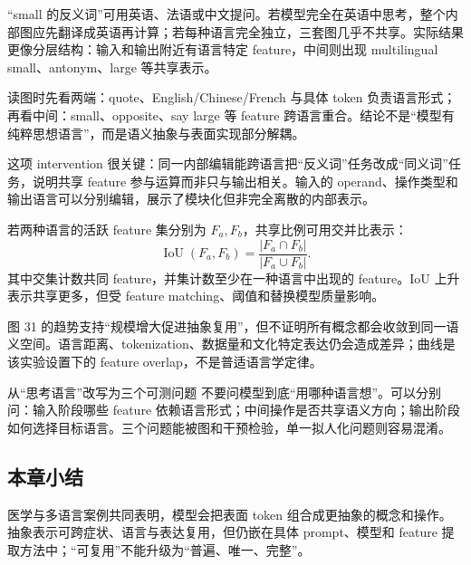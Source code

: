 “small 的反义词”可用英语、法语或中文提问。若模型完全在英语中思考，整个内部图应先翻译成英语再计算；若每种语言完全独立，三套图几乎不共享。实际结果更像分层结构：输入和输出附近有语言特定 feature，中间则出现 multilingual small、antonym、large 等共享表示。



读图时先看两端：quote、English/Chinese/French 与具体 token 负责语言形式；再看中间：small、opposite、say large 等 feature 跨语言重合。结论不是“模型有纯粹思想语言”，而是语义抽象与表面实现部分解耦。


这项 intervention 很关键：同一内部编辑能跨语言把“反义词”任务改成“同义词”任务，说明共享 feature 参与运算而非只与输出相关。输入的 operand、操作类型和输出语言可以分别编辑，展示了模块化但非完全离散的内部表示。

若两种语言的活跃 feature 集分别为 $F_a,F_b$，共享比例可用交并比表示：
\[
\operatorname{IoU}(F_a,F_b)=\frac{|F_a\cap F_b|}{|F_a\cup F_b|}.
\]
其中交集计数共同 feature，并集计数至少在一种语言中出现的 feature。IoU 上升表示共享更多，但受 feature matching、阈值和替换模型质量影响。


图 31 的趋势支持“规模增大促进抽象复用”，但不证明所有概念都会收敛到同一语义空间。语言距离、tokenization、数据量和文化特定表达仍会造成差异；曲线是该实验设置下的 feature overlap，不是普适语言学定律。

\begin{knowledgebox}{从“思考语言”改写为三个可测问题}
不要问模型到底“用哪种语言想”。可以分别问：输入阶段哪些 feature 依赖语言形式；中间操作是否共享语义方向；输出阶段如何选择目标语言。三个问题能被图和干预检验，单一拟人化问题则容易混淆。
\end{knowledgebox}

\subsection{本章小结}

医学与多语言案例共同表明，模型会把表面 token 组合成更抽象的概念和操作。抽象表示可跨症状、语言与表达复用，但仍嵌在具体 prompt、模型和 feature 提取方法中；“可复用”不能升级为“普遍、唯一、完整”。

